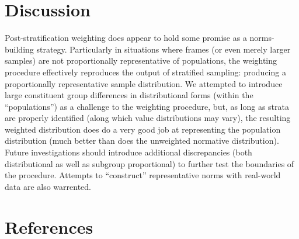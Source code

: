 \documentclass[
  ,man]{apa7}
\begin{document}
\hypertarget{discussion}{%
\section{Discussion}\label{discussion}}

Post-stratification weighting does appear to hold some promise as a norms-building strategy. Particularly in situations where frames (or even merely larger samples) are not proportionally representative of populations, the weighting procedure effectively reproduces the output of stratified sampling: producing a proportionally representative sample distribution. We attempted to introduce large constituent group differences in distributional forms (within the ``populations'') as a challenge to the weighting procedure, but, as long as strata are properly identified (along which value distributions may vary), the resulting weighted distribution does do a very good job at representing the population distribution (much better than does the unweighted normative distribution). Future investigations should introduce additional discrepancies (both distributional as well as subgroup proportional) to further test the boundaries of the procedure. Attempts to ``construct'' representative norms with real-world data are also warrented.

\newpage

\hypertarget{references}{%
\section{References}\label{references}}

\begingroup
\setlength{\parindent}{-0.5in}
\setlength{\leftskip}{0.5in}
\end{document}
